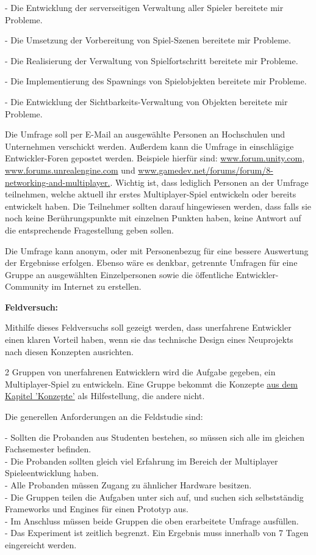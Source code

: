 - Die Entwicklung der serverseitigen Verwaltung aller Spieler bereitete mir Probleme.

- Die Umsetzung der Vorbereitung von Spiel-Szenen bereitete mir Probleme.

- Die Realisierung der Verwaltung von Spielfortschritt bereitete mir Probleme.

- Die Implementierung des Spawnings von Spielobjekten bereitete mir Probleme.

- Die Entwicklung der Sichtbarkeits-Verwaltung von Objekten bereitete mir Probleme.

Die Umfrage soll per E-Mail an ausgewählte Personen an Hochschulen und Unternehmen verschickt werden. Außerdem kann die Umfrage in einschlägige Entwickler-Foren gepostet werden. Beispiele hierfür sind: \href{www.forum.unity.com}{www.forum.unity.com}, \href{www.forums.unrealengine.com}{www.forums.unrealengine.com} und \href{www.gamedev.net/forums/forum/8-networking-and-multiplayer}{www.gamedev.net/forums/forum/8-networking-and-multiplayer.}. Wichtig ist, dass lediglich Personen an der Umfrage teilnehmen, welche aktuell ihr erstes Multiplayer-Spiel entwickeln oder bereits entwickelt haben. Die Teilnehmer sollten darauf hingewiesen werden, dass falls sie noch keine Berührungspunkte mit einzelnen Punkten haben, keine Antwort auf die entsprechende Fragestellung geben sollen.

Die Umfrage kann anonym, oder mit Personenbezug für eine bessere Auswertung der Ergebnisse erfolgen. Ebenso wäre es denkbar, getrennte Umfragen für eine Gruppe an ausgewählten Einzelpersonen sowie die öffentliche Entwickler-Community im Internet zu erstellen.

\textbf{Feldversuch:}

Mithilfe dieses Feldversuchs soll gezeigt werden, dass unerfahrene Entwickler einen klaren Vorteil haben, wenn sie das technische Design eines Neuprojekts nach diesen Konzepten ausrichten. 

2 Gruppen von unerfahrenen Entwicklern wird die Aufgabe gegeben, ein Multiplayer-Spiel zu entwickeln. Eine Gruppe bekommt die Konzepte \hyperref[sec:konzepte]{aus dem Kapitel 'Konzepte'} als Hilfestellung, die andere nicht.

Die generellen Anforderungen an die Feldstudie sind:

- Sollten die Probanden aus Studenten bestehen, so müssen sich alle im gleichen Fachsemester befinden. \\
- Die Probanden sollten gleich viel Erfahrung im Bereich der Multiplayer Spieleentwicklung haben. \\
- Alle Probanden müssen Zugang zu ähnlicher Hardware besitzen. \\
- Die Gruppen teilen die Aufgaben unter sich auf, und suchen sich selbstständig Frameworks und Engines für einen Prototyp aus. \\
- Im Anschluss müssen beide Gruppen die oben erarbeitete Umfrage ausfüllen. \\
- Das Experiment ist zeitlich begrenzt. Ein Ergebnis muss innerhalb von 7 Tagen eingereicht werden. 

